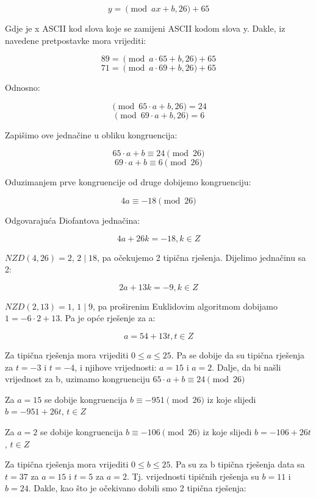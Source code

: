 \documentclass[12pt]{article}
\begin{document}
$$y = \pmod{ax + b, 26} + 65$$\vspace{1mm}

Gdje je x ASCII kod slova koje se zamijeni ASCII kodom slova y. Dakle, iz navedene pretpostavke mora vrijediti:

$$89 = \pmod{a\cdot65 + b, 26} + 65$$ 
$$71 = \pmod{a\cdot69 + b, 26} + 65$$

Odnosno:

$$\pmod{65\cdot a + b, 26} = 24$$
$$\pmod{69\cdot a + b, 26} = 6$$\vspace{1mm}

Zapišimo ove jednačine u obliku kongruencija:

$$65\cdot a + b \equiv 24 \pmod{26}$$
$$69\cdot a + b \equiv 6 \pmod{26}$$\vspace{1mm}

Oduzimanjem prve kongruencije od druge dobijemo kongruenciju:

$$4a \equiv -18\pmod{26}$$\vspace{1mm}

Odgovarajuća Diofantova jednačina:

$$4a + 26k = -18, k \in Z$$\vspace{1mm} 

$NZD(4, 26) = 2$, $2 \mid 18$, pa očekujemo 2 tipična rješenja. Dijelimo jednačinu sa 2:

$$2a + 13k = -9, k \in Z$$\vspace{1mm}

$NZD(2, 13) = 1$, $1 \mid 9$, pa proširenim Euklidovim algoritmom dobijamo $1 = -6\cdot 2 + 13$. Pa je opće rješenje za a:

$$a = 54 + 13t, t \in Z$$\vspace{1mm}

Za tipična rješenja mora vrijediti $0 \leq a \leq 25$. Pa se dobije da su tipična rješenja za $t = -3$ i $t = -4$, i njihove vrijednosti: $a = 15$ i $a = 2$.
Dalje, da bi našli vrijednost za b, uzimamo kongruenciju $65\cdot a + b \equiv 24 \pmod{26}$\vspace{1mm}

Za $a = 15$ se dobije kongruencija $b \equiv -951 \pmod{26}$ iz koje slijedi $b = -951 + 26t$, $t \in Z$

Za $a = 2$ se dobije kongruencija $b \equiv -106 \pmod{26}$ iz koje slijedi $b = -106 + 26t$, $t \in Z$\vspace{1mm}

Za tipična rješenja mora vrijediti $0 \leq b \leq 25$. Pa su za b tipična rješenja data sa $t = 37$ za $a = 15$ i $t = 5$ za $a = 2$.  Tj. vrijednosti tipičnih rješenja su $b = 11$ i $b = 24$. Dakle, kao što je očekivano dobili smo 2 tipična rješenja: 
\end{document}
